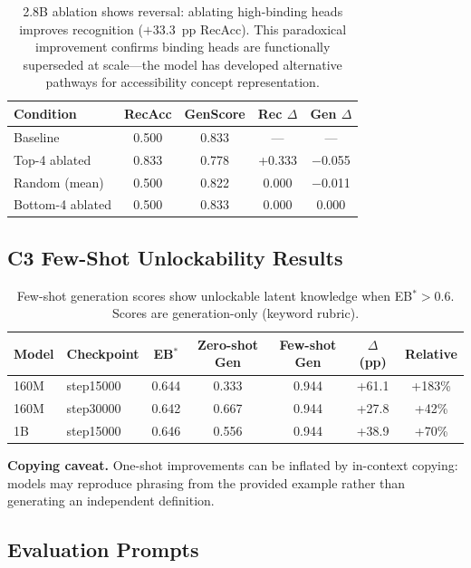 \documentclass[10pt]{article} %
\begin{document}
\begin{table}[H]
\centering
\small
\begin{tabular}{|l|c|c|c|c|}
\hline
\textbf{Condition} & \textbf{RecAcc} & \textbf{GenScore} & \textbf{Rec $\Delta$} & \textbf{Gen $\Delta$} \\
\hline
Baseline & 0.500 & 0.833 & --- & --- \\
Top-4 ablated & 0.833 & 0.778 & +0.333 & $-$0.055 \\
Random (mean) & 0.500 & 0.822 & 0.000 & $-$0.011 \\
Bottom-4 ablated & 0.500 & 0.833 & 0.000 & 0.000 \\
\hline
\end{tabular}
\caption{2.8B ablation shows reversal: ablating high-binding heads improves recognition ($+33.3$~pp RecAcc). This paradoxical improvement confirms binding heads are functionally superseded at scale---the model has developed alternative pathways for accessibility concept representation.}
\end{table}

\subsection*{C3 Few-Shot Unlockability Results}

\begin{table}[ht]
\centering
\small
\begin{tabular}{|l|l|c|c|c|c|c|}
\hline
\textbf{Model} & \textbf{Checkpoint} & \textbf{EB$^*$} & \textbf{Zero-shot Gen} & \textbf{Few-shot Gen} & \textbf{$\Delta$ (pp)} & \textbf{Relative} \\
\hline
160M & step15000 & 0.644 & 0.333 & 0.944 & +61.1 & +183\% \\
160M & step30000 & 0.642 & 0.667 & 0.944 & +27.8 & +42\% \\
1B & step15000 & 0.646 & 0.556 & 0.944 & +38.9 & +70\% \\
\hline
\end{tabular}
\caption{Few-shot generation scores show unlockable latent knowledge when EB$^*>0.6$. Scores are generation-only (keyword rubric).}
\end{table}

\noindent\textbf{Copying caveat.} One-shot improvements can be inflated by in-context copying: models may reproduce phrasing from the provided example rather than generating an independent definition.

\subsection*{Evaluation Prompts}
\end{document}
